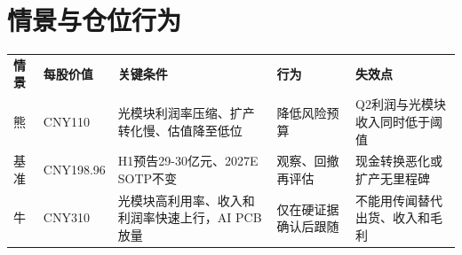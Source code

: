 \section{情景与仓位行为}
\begin{exhibitbox}
\begin{tabularx}{\exhibitboxwidth}{L{1.6cm}L{2.1cm}X L{2.3cm}X}
\textbf{情景} & \textbf{每股价值} & \textbf{关键条件} & \textbf{行为} & \textbf{失效点} \\
熊 & CNY110 & 光模块利润率压缩、扩产转化慢、估值降至低位 & 降低风险预算 & Q2利润与光模块收入同时低于阈值 \\
基准 & CNY198.96 & H1预告29-30亿元、2027E SOTP不变 & 观察、回撤再评估 & 现金转换恶化或扩产无里程碑 \\
牛 & CNY310 & 光模块高利用率、收入和利润率快速上行，AI PCB放量 & 仅在硬证据确认后跟随 & 不能用传闻替代出货、收入和毛利 \\
\end{tabularx}
\end{exhibitbox}
